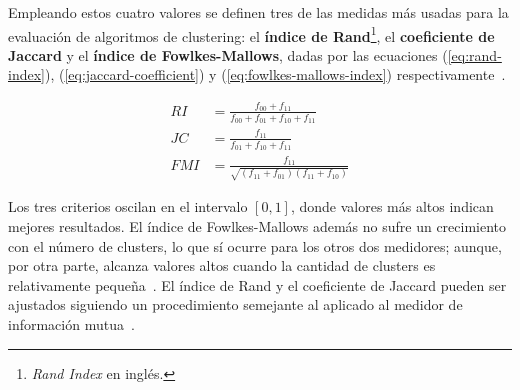 Empleando estos cuatro valores se definen tres de las medidas más usadas para la evaluación de algoritmos de clustering: el \textbf{índice de Rand}\footnote{\textit{Rand Index} en inglés.}, el \textbf{coeficiente de Jaccard} y el \textbf{índice de Fowlkes-Mallows}, dadas por las ecuaciones (\ref{eq:rand-index}), (\ref{eq:jaccard-coefficient}) y (\ref{eq:fowlkes-mallows-index}) respectivamente~\cite{Aggarawal13,Tan05,Wagner07}.

\begin{align}
    \label{eq:rand-index}
    RI & = \frac{f_{00} + f_{11}}{f_{00}+f_{01}+f_{10}+f_{11}} \\
    \label{eq:jaccard-coefficient}
    JC & = \frac{f_{11}}{f_{01}+f_{10}+f_{11}} \\
    \label{eq:fowlkes-mallows-index}
    FMI & = \frac{f_{11}}{\sqrt{(f_{11}+f_{01})(f_{11}+f_{10})}}
\end{align}

Los tres criterios oscilan en el intervalo $[0,1]$, donde valores más altos indican mejores resultados.
El índice de Fowlkes-Mallows además no sufre un crecimiento con el número de clusters, lo que sí ocurre para los otros dos medidores;
aunque, por otra parte, alcanza valores altos cuando la cantidad de clusters es relativamente pequeña~\cite{Wagner07}.
El índice de Rand y el coeficiente de Jaccard pueden ser ajustados siguiendo un procedimiento semejante al aplicado al medidor de información mutua~\cite{Vinh10, Wagner07}.

